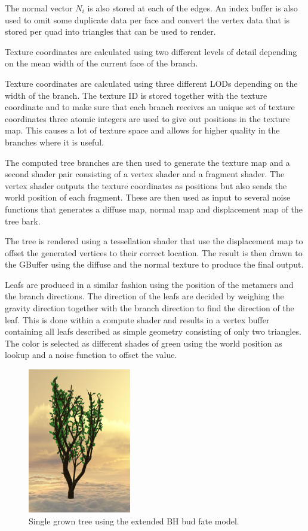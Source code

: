 \documentclass[11pt]{article} %
\begin{document}
The normal vector $ N_{i} $ is also stored at each of the edges.
An index buffer is also used to omit some duplicate data per face and convert the vertex data that is stored per quad into triangles that can be used to render.

Texture coordinates are calculated using two different levels of detail depending on the mean width of the current face of the branch.


Texture coordinates are calculated using three different LODs depending on the width of the branch.
The texture ID is stored together with the texture coordinate and to make sure that each branch receives an unique set of texture coordinates three atomic integers are used to give out positions in the texture map.
This causes a lot of texture space and allows for higher quality in the branches where it is useful.

The computed tree branches are then used to generate the texture map and a second shader pair consisting of a vertex shader and a fragment shader.
The vertex shader outputs the texture coordinates as positions but also sends the world position of each fragment.
These are then used as input to several noise functions that generates a diffuse map, normal map and displacement map of the tree bark.

The tree is rendered using a tessellation shader that use the displacement map to offset the generated vertices to their correct location.
The result is then drawn to the GBuffer using the diffuse and the normal texture to produce the final output.

Leafs are produced in a similar fashion using the position of the metamers and the branch directions.
The direction of the leafs are decided by weighing the gravity direction together with the branch direction to find the direction of the leaf.
This is done within a compute shader and results in a vertex buffer containing all leafs described as simple geometry consisting of only two triangles.
The color is selected as different shades of green using the world position as lookup and a noise function to offset the value.

\begin{figure}[htp]
	\centering
	\includegraphics[width=0.4\textwidth]{1tree.png}
	\caption{Single grown tree using the extended BH bud fate model.}
	\label{fig:res_1tree}
\end{figure}
\end{document}
